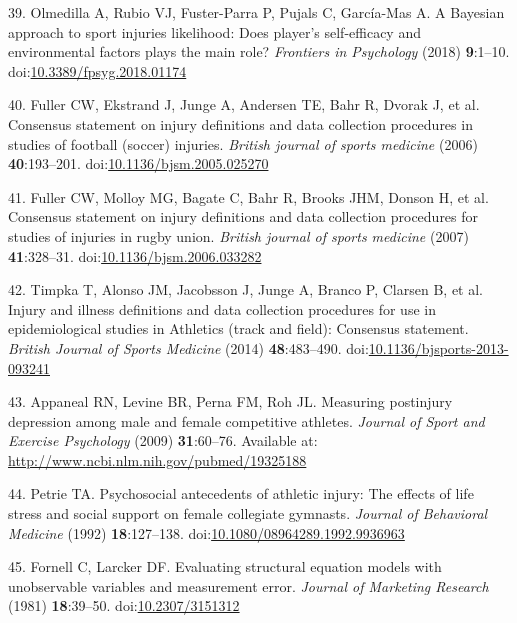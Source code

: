 \documentclass[
  english,
  man]{apa6}
\newenvironment{cslreferences}%
  {}%
  {\par}
\begin{document}
\begin{cslreferences}
\leavevmode\hypertarget{ref-Olmedilla2018}{}%
39. Olmedilla A, Rubio VJ, Fuster-Parra P, Pujals C, García-Mas A. A Bayesian approach to sport injuries likelihood: Does player's self-efficacy and environmental factors plays the main role? \emph{Frontiers in Psychology} (2018) \textbf{9}:1--10. doi:\href{https://doi.org/10.3389/fpsyg.2018.01174}{10.3389/fpsyg.2018.01174}

\leavevmode\hypertarget{ref-Fuller2006}{}%
40. Fuller CW, Ekstrand J, Junge A, Andersen TE, Bahr R, Dvorak J, et al. Consensus statement on injury definitions and data collection procedures in studies of football (soccer) injuries. \emph{British journal of sports medicine} (2006) \textbf{40}:193--201. doi:\href{https://doi.org/10.1136/bjsm.2005.025270}{10.1136/bjsm.2005.025270}

\leavevmode\hypertarget{ref-Fuller2007b}{}%
41. Fuller CW, Molloy MG, Bagate C, Bahr R, Brooks JHM, Donson H, et al. Consensus statement on injury definitions and data collection procedures for studies of injuries in rugby union. \emph{British journal of sports medicine} (2007) \textbf{41}:328--31. doi:\href{https://doi.org/10.1136/bjsm.2006.033282}{10.1136/bjsm.2006.033282}

\leavevmode\hypertarget{ref-Timpka2014}{}%
42. Timpka T, Alonso JM, Jacobsson J, Junge A, Branco P, Clarsen B, et al. Injury and illness definitions and data collection procedures for use in epidemiological studies in Athletics (track and field): Consensus statement. \emph{British Journal of Sports Medicine} (2014) \textbf{48}:483--490. doi:\href{https://doi.org/10.1136/bjsports-2013-093241}{10.1136/bjsports-2013-093241}

\leavevmode\hypertarget{ref-Appaneal2009}{}%
43. Appaneal RN, Levine BR, Perna FM, Roh JL. Measuring postinjury depression among male and female competitive athletes. \emph{Journal of Sport and Exercise Psychology} (2009) \textbf{31}:60--76. Available at: \url{http://www.ncbi.nlm.nih.gov/pubmed/19325188}

\leavevmode\hypertarget{ref-Petrie1992}{}%
44. Petrie TA. Psychosocial antecedents of athletic injury: The effects of life stress and social support on female collegiate gymnasts. \emph{Journal of Behavioral Medicine} (1992) \textbf{18}:127--138. doi:\href{https://doi.org/10.1080/08964289.1992.9936963}{10.1080/08964289.1992.9936963}

\leavevmode\hypertarget{ref-Fornell1981}{}%
45. Fornell C, Larcker DF. Evaluating structural equation models with unobservable variables and measurement error. \emph{Journal of Marketing Research} (1981) \textbf{18}:39--50. doi:\href{https://doi.org/10.2307/3151312}{10.2307/3151312}


\end{cslreferences}
\end{document}
